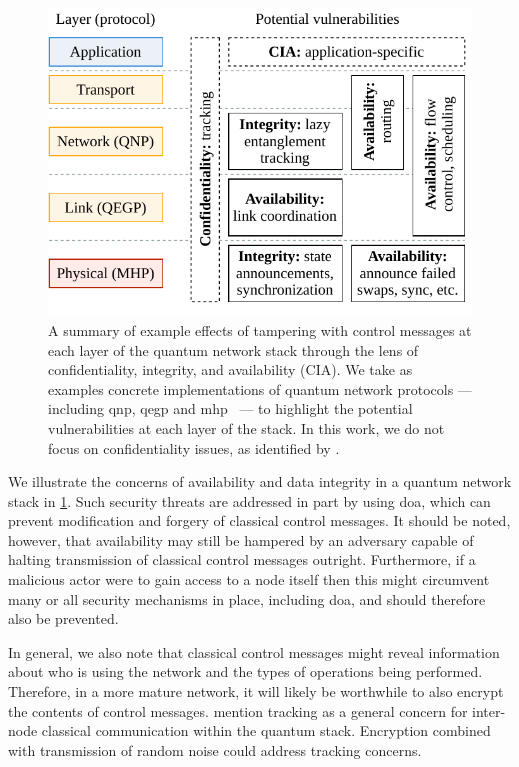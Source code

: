 \begin{figure}[t]
    \centering
    \includegraphics[width=0.6\linewidth]{figures/doa-examples.pdf}
    \caption{
        A summary of example effects of tampering with control messages at each layer of the quantum
        network stack through the lens of confidentiality, integrity, and availability (CIA). We
        take as examples concrete implementations of quantum network protocols --- including
        \acrshort{qnp}, \acrshort{qegp} and \acrshort{mhp}~\cite{kozlowski_2020_qnp,
        dahlberg_2019_egp} --- to highlight the potential vulnerabilities at each layer of the
        stack. In this work, we do not focus on confidentiality issues, as identified by
        \textcite{satoh_2020_attacking}.
    }
    \label{fig:doa-examples}
\end{figure}

We illustrate the concerns of availability and data integrity in a quantum network stack in
\cref{fig:doa-examples}. Such security threats are addressed in part by using \acrlong{doa}, which
can prevent modification and forgery of classical control messages. It should be noted, however,
that availability may still be hampered by an adversary capable of halting transmission of classical
control messages outright. Furthermore, if a malicious actor were to gain access to a node itself
then this might circumvent many or all security mechanisms in place, including \acrshort{doa}, and
should therefore also be prevented.

In general, we also note that classical control messages might reveal information about who is using
the network and the types of operations being performed. Therefore, in a more mature network, it
will likely be worthwhile to also encrypt the contents of control messages.
\textcite{satoh_2020_attacking} mention tracking as a general concern for inter-node classical
communication within the quantum stack. Encryption combined with transmission of random noise could
address tracking concerns.

